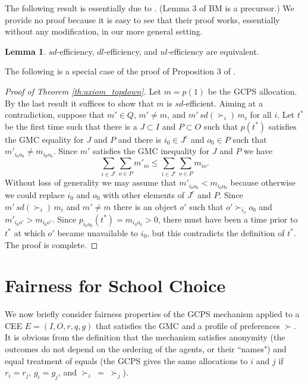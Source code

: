 \documentclass[12pt, A4paper]{article}
\theoremstyle{definition}
\newtheorem{lem}{Lemma}
\begin{document}
The following result is essentially due to \cite{cd16}.  (Lemma 3 of BM is a precursor.)  We provide no proof because it is easy to see that their proof works, essentially without any modification, in our more general setting.

\begin{lem}\label{lem:cyclic} 
  $sd$-efficiency, $dl$-efficiency, and $ul$-efficiency are equivalent. 
\end{lem}

The following is a special case of the proof of Proposition 3 of \cite{balbuzanov22jet}.  

\begin{proof}[Proof of Theorem \ref{th:axiom_topdown}] 
Let $m = p(1)$ be the GCPS allocation.  By the last result it suffices to show that $m$ is $sd$-efficient.  Aiming at a contradiction, suppose that $m' \in Q$, $m' \ne m$, and $m' \, sd(\succ_i) \, m_i$ for all $i$.  Let $t^*$ be the first time such that there is a $J \subset I$ and $P \subset O$ such that 
$p(t^*)$ satisfies the GMC equality for $J$ and $P$ and there is $i_0 \in J^c$ and $o_0 \in P$ such that $m'_{i_0o_0} \ne m_{i_0o_0}$.  Since $m'$ satisfies the GMC inequality for $J$ and $P$ we have
$$\sum_{i \in J^c}\sum_{o \in P} m'_{io} \le \sum_{i \in J^c}\sum_{o \in P} m_{io}.$$
Without loss of generality we may assume that $m'_{i_0o_0} < m_{i_0o_0}$ because otherwise we could replace $i_0$ and $o_0$ with other elements of $J^c$ and $P$.  Since $m' \, sd(\succ_i) \, m_i$ and $m' \ne m$ there is an object $o'$ such that $o' \succ_{i_o} o_0$ and $m'_{i_0o'} > m_{i_0o'}$.  Since $p_{i_0o_0}(t^*) = m_{i_0o_0} > 0$, there must have been a time prior to $t^*$ at which $o'$ became unavailable to $i_0$, but this contradicts the definition of $t^*$.  The proof is complete.
\end{proof}

\section{Fairness for School Choice} \label{sec:Fairness}

We now briefly consider fairness properties of the GCPS mechanism applied to a CEE $E = (I,O,r,q,g)$ that satisfies the GMC and a profile of preferences $\succ$.  It is obvious from the definition that the mechanism satisfies  anonymity (the outcomes do not depend on the ordering of the agents, or their ``names") and equal treatment of equals (the GCPS gives the same allocations to $i$ and $j$ if $r_i = r_j$, $g_i = g_j$, and $\succ_i \; = \; \succ_j$).
\end{document}
